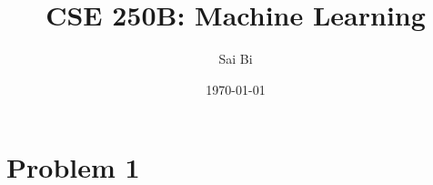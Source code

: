 \documentclass[a4paper,11pt]{article}
\theoremstyle{mytheor}
\begin{document}
\title{CSE 250B: Machine Learning}

\author{Sai Bi}

\date{\today}

\maketitle

\section*{Problem 1}
\end{document}
